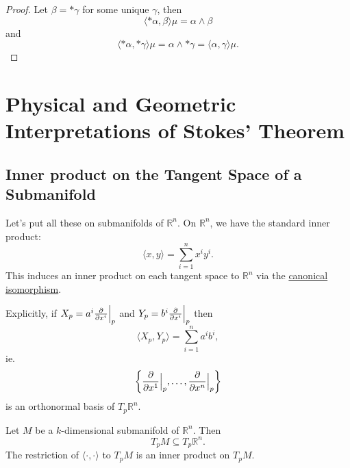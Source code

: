 \documentclass[notoc,notitlepage]{tufte-book}
\begin{document}
\begin{proof}
  Let $\beta = * \gamma$ for some unique $\gamma$, then
  \begin{equation*}
    \langle *\alpha, \beta \rangle \mu = \alpha \land \beta
  \end{equation*}
  and
  \begin{equation*}
    \langle *\alpha, *\gamma \rangle \mu  = \alpha \land * \gamma = \langle
    \alpha, \gamma \rangle \mu.
  \end{equation*}
\end{proof}


\section{Physical and Geometric Interpretations of Stokes' Theorem}%
\label{sec:physical_and_geometric_interpretations_of_stokes_theorem}

\subsection{Inner product on the Tangent Space of a Submanifold}%
\label{sub:inner_product_on_the_tangent_space_of_a_submanifold}

Let's put all these on submanifolds of $\mathbb{R}^n$. On $\mathbb{R}^n$, we
have the standard inner product:
\begin{equation*}
  \langle x, y \rangle = \sum_{i=1}^{n} x^i y^i.
\end{equation*}
This induces an inner product on each tangent space to $\mathbb{R}^n$ via the
\hyperref[propo:canonical_bijection_from_t_p_r_n_to_r_n_]{canonical
isomorphism}.

Explicitly, if $X_p = a^i \frac{\partial}{\partial x^i} \Big|_{p}^{}$ and $Y_p = b^i
\frac{\partial}{\partial x^i}\Big|_{p}^{}$ then
\begin{equation*}
  \langle X_p, Y_p \rangle = \sum_{i=1}^{n} a^i b^i,
\end{equation*}
ie.
\begin{equation*}
  \left\{ \frac{\partial}{\partial x^1}\Big|_{p}^{}, \ldots,
  \frac{\partial}{\partial x^n}\Big|_{p}^{} \right\}
\end{equation*}
is an orthonormal basis of $T_p \mathbb{R}^n$.

Let $M$ be a $k$-dimensional submanifold of $\mathbb{R}^n$. Then
\begin{equation*}
  T_p M \subseteq T_p \mathbb{R}^n.
\end{equation*}
The restriction of $\langle \cdot, \cdot \rangle$ to $T_p M$ is an inner product
on $T_p M$.
\end{document}
